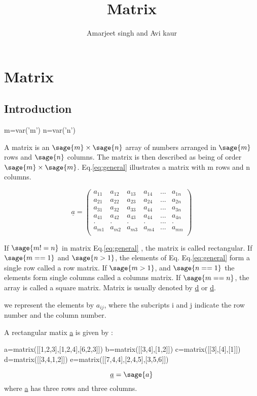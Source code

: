 \documentclass[12pt]{report}
\title{\textbf{Matrix}}
\author{Amarjeet singh and Avi kaur}
\newcommand{\lab}[1]{
Eq.\ref{#1}
}
\begin{document}
\begin{titlepage}
\maketitle
\end{titlepage}
\chapter{Matrix}
\section{Introduction}
\begin{sagesilent}
m=var('m')
n=var('n')
\end{sagesilent}

A matrix is an $\sage{m} \times \sage{n}$  array of numbers arranged in $\sage{m}$ rows and $\sage{n}$ columns. The matrix is then described as being of order $\sage{m} \times \sage{m}$. \lab{eq:general} illustrates a matrix with m rows and n columns.


\begin{equation}
\underline{a}=\left(\begin{array}{rrrrrr}
a_{11} & a_{12} & a_{13} & a_{14} & ... & a_{1n} \\
a_{21} & a_{22} & a_{23} & a_{24} & ... & a_{2n} \\
a_{31} & a_{32} & a_{33} & a_{44} & ... & a_{3n} \\
a_{41} & a_{42} & a_{43} & a_{44} & ... & a_{4n} \\
.     & .     & .     & .     & ... & .     \\
a_{m1} & a_{m2} & a_{m3} & a_{m4} & ... & a_{mn} \\
\end{array}\right) \label{eq:general}          
\end{equation}

If $\sage{m!=n}$ in matrix \lab{eq:general}, the matrix is called rectangular. If $\sage{m==1}$ and $\sage{n>1}$, the elements of Eq.\lab{eq:general} form a single row called a row matrix. If $\sage{m>1}$, and $\sage{n==1}$ the elements form single columns called a columns matrix. If $\sage{m==n}$, the array is called a square matrix.
Matrix is usually denoted by \underline{d} or \underline{d}.

we represent the elements by $a_{{ij}}$, where the subcripts i and j indicate the row number and the column number.

A rectangular matix \underline{a} is given by : 
\begin{sagesilent}
a=matrix([[1,2,3],[1,2,4],[6,2,3]])
b=matrix([[3,4],[1,2]])
c=matrix([[3],[4],[1]])
d=matrix([[3,4,1,2]])
e=matrix([[7,4,4],[2,4,5],[3,5,6]])
\end{sagesilent}
\begin{equation}
\underline{a}=\sage{a}
\label{eq:rectangle}
\end{equation}
where \underline{a} has three rows and three columns.
\end{document}
